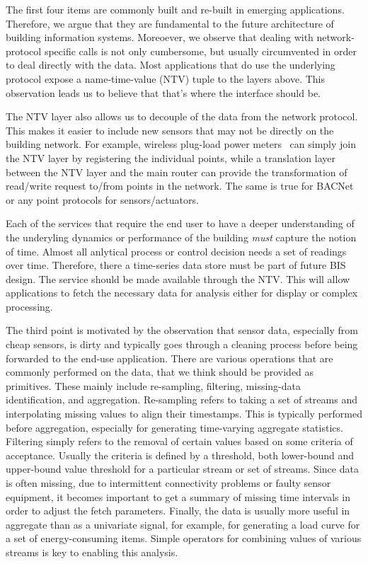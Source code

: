 The first four items are commonly built and re-built in emerging applications.  Therefore, we argue that they are fundamental 
to the future architecture of building information systems.  Moreoever, we observe that dealing with network-protocol specific
calls is not only cumbersome, but usually circumvented in order to deal directly with the data.  Most applications that do
use the underlying protocol expose a name-time-value (NTV) tuple to the layers above.  This observation leads us to believe that
that's where the interface should be.

The NTV layer also allows us to decouple of the data from the network protocol.  This makes it easier to include 
new sensors that may not be directly on the building network.  For example, wireless plug-load power meters~\cite{ACme}
can simply join the NTV layer by registering the individual points, while a translation layer between the NTV layer and the
main router can provide the transformation of read/write request to/from points in the network.  The same is true for BACNet
or any point protocols for sensors/actuators.

Each of the services that require the end user to have a deeper understanding of the underyling dynamics or performance
of the building \emph{must} capture the notion of time.  Almost all anlytical process or control decision needs a set of readings
over time.  Therefore, there a time-series data store must be part of future BIS design.  The service should be made available
through the NTV.  This will allow applications to fetch the necessary data for analysis either for display or complex processing.

The third point is motivated by the observation that sensor data, especially from cheap sensors, is dirty and typically goes
through a cleaning process before being forwarded to the end-use application.  There are various operations that are commonly
performed on the data, that we think should be provided as primitives.  These mainly include re-sampling, filtering,  
missing-data identification, and aggregation.  Re-sampling refers to taking a set of streams and interpolating missing values to 
align their timestamps.  This is typically performed before aggregation, especially for generating time-varying aggregate statistics.
Filtering simply refers to the removal of certain values based on some criteria of acceptance.  Usually the criteria is defined
by a threshold, both lower-bound and upper-bound value threshold for a particular stream or set of streams.
Since data is often missing, due to intermittent connectivity problems or faulty sensor equipment, it becomes important to 
get a summary of missing time intervals in order to adjust the fetch parameters.  Finally, the data is usually more
useful in aggregate than as a univariate signal, for example, for generating a load curve for a set of energy-consuming items.
Simple operators for combining values of various streams is key to enabling this analysis.

